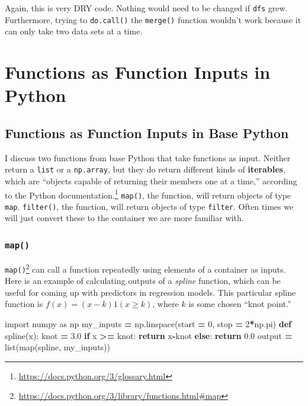 \documentclass[
  12pt,
  krantz2]{krantz}
\makeatletter
\newenvironment{Shaded}{\begin{snugshade}}{\end{snugshade}}
\newcommand{\BuiltInTok}[1]{#1}
\newcommand{\ControlFlowTok}[1]{\textcolor[rgb]{0.27,0.27,0.27}{\textbf{#1}}}
\newcommand{\DecValTok}[1]{\textcolor[rgb]{0.06,0.06,0.06}{#1}}
\newcommand{\FloatTok}[1]{\textcolor[rgb]{0.06,0.06,0.06}{#1}}
\newcommand{\ImportTok}[1]{#1}
\newcommand{\KeywordTok}[1]{\textcolor[rgb]{0.27,0.27,0.27}{\textbf{#1}}}
\newcommand{\NormalTok}[1]{#1}
\newcommand{\OperatorTok}[1]{\textcolor[rgb]{0.43,0.43,0.43}{\textbf{#1}}}
\renewcommand{\href}[2]{#2\footnote{\url{#1}}}
\newenvironment{kframe}{%
\medskip{}
\setlength{\fboxsep}{.8em}
 \def\at@end@of@kframe{}%
 \ifinner\ifhmode%
  \def\at@end@of@kframe{\end{minipage}}%
  \begin{minipage}{\columnwidth}%
 \fi\fi%
 \def\FrameCommand##1{\hskip\@totalleftmargin \hskip-\fboxsep
 \colorbox{shadecolor}{##1}\hskip-\fboxsep
     \hskip-\linewidth \hskip-\@totalleftmargin \hskip\columnwidth}%
 \MakeFramed {\advance\hsize-\width
   \@totalleftmargin\z@ \linewidth\hsize
   \@setminipage}}%
 {\par\unskip\endMakeFramed%
 \at@end@of@kframe}
\renewenvironment{Shaded}{\begin{kframe}}{\end{kframe}}
\makeatother
\begin{document}
Again, this is very DRY code. Nothing would need to be changed if \texttt{dfs} grew. Furthermore, trying to \texttt{do.call()} the \texttt{merge()} function wouldn't work because it can only take two data sets at a time.

\hypertarget{functions-as-function-inputs-in-python}{%
\section{Functions as Function Inputs in Python}\label{functions-as-function-inputs-in-python}}

\hypertarget{functions-as-function-inputs-in-base-python}{%
\subsection{Functions as Function Inputs in Base Python}\label{functions-as-function-inputs-in-base-python}}

I discuss two functions from base Python that take functions as input. Neither return a \texttt{list} or a \texttt{np.array}, but they do return different kinds of \textbf{iterables}, which are ``objects capable of returning their members one at a time,'' \href{https://docs.python.org/3/glossary.html}{according to the Python documentation.} \texttt{map()}, the function, will return objects of type \texttt{map}. \texttt{filter()}, the function, will return objects of type \texttt{filter}. Often times we will just convert these to the container we are more familiar with.

\hypertarget{map}{%
\subsubsection{\texorpdfstring{\texttt{map()}}{map()}}\label{map}}

\href{https://docs.python.org/3/library/functions.html\#map}{\texttt{map()}} can call a function repeatedly using elements of a container as inputs. Here is an example of calculating outputs of a \emph{spline} function, which can be useful for coming up with predictors in regression models. This particular spline function is \(f(x) = (x-k)1(x \ge k)\), where \(k\) is some chosen ``knot point.''

\begin{Shaded}
\begin{Highlighting}[]
\ImportTok{import}\NormalTok{ numpy }\ImportTok{as}\NormalTok{ np}
\NormalTok{my\_inputs }\OperatorTok{=}\NormalTok{ np.linspace(start }\OperatorTok{=} \DecValTok{0}\NormalTok{, stop }\OperatorTok{=} \DecValTok{2}\OperatorTok{*}\NormalTok{np.pi)}
\KeywordTok{def}\NormalTok{ spline(x):}
\NormalTok{    knot }\OperatorTok{=} \FloatTok{3.0}
    \ControlFlowTok{if}\NormalTok{ x }\OperatorTok{\textgreater{}=}\NormalTok{ knot:}
        \ControlFlowTok{return}\NormalTok{ x}\OperatorTok{{-}}\NormalTok{knot}
    \ControlFlowTok{else}\NormalTok{:}
        \ControlFlowTok{return} \FloatTok{0.0}
\NormalTok{output }\OperatorTok{=} \BuiltInTok{list}\NormalTok{(}\BuiltInTok{map}\NormalTok{(spline, my\_inputs))}
\end{Highlighting}
\end{Shaded}
\end{document}
